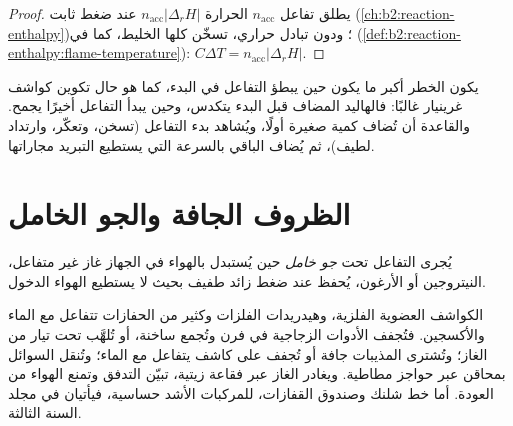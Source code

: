 \begin{proof}
يطلق تفاعل $n_{\mathrm{acc}}$ الحرارة $n_{\mathrm{acc}}|\Delta_rH|$ عند ضغط ثابت
(\cref{ch:b2:reaction-enthalpy})؛ ودون تبادل حراري، تسخّن كلها الخليط، كما في
 (\cref{def:b2:reaction-enthalpy:flame-temperature}): $C\Delta T =
n_{\mathrm{acc}}|\Delta_rH|$.
\end{proof}

يكون الخطر أكبر ما يكون حين يبطؤ التفاعل في البدء، كما هو حال تكوين كواشف غرينيار غالبًا: فالهاليد المضاف
قبل البدء يتكدس، وحين يبدأ التفاعل أخيرًا يجمح. والقاعدة أن تُضاف كمية صغيرة
أولًا، ويُشاهد بدء التفاعل (تسخن، وتعكّر، وارتداد لطيف)، ثم يُضاف الباقي بالسرعة
التي يستطيع التبريد مجاراتها.

\section{الظروف الجافة والجو الخامل}

\begin{definition}\label{def:b2:lab-techniques-2:inert}
يُجرى التفاعل تحت \emph{جو خامل} حين يُستبدل بالهواء في الجهاز
غاز غير متفاعل، النيتروجين أو الأرغون، يُحفظ عند ضغط زائد طفيف بحيث لا
يستطيع الهواء الدخول.
\end{definition}

الكواشف العضوية الفلزية، وهيدريدات الفلزات وكثير من الحفازات تتفاعل مع الماء والأكسجين. فتُجفف الأدوات
الزجاجية في فرن وتُجمع ساخنة، أو تُلهَّب تحت تيار من الغاز؛ وتُشترى المذيبات جافة أو تُجفف
على كاشف يتفاعل مع الماء؛ وتُنقل السوائل بمحاقن عبر حواجز مطاطية.
ويغادر الغاز عبر فقاعة زيتية، تبيّن التدفق وتمنع الهواء من العودة. أما
خط شلنك وصندوق القفازات، للمركبات الأشد حساسية، فيأتيان في مجلد السنة الثالثة.

